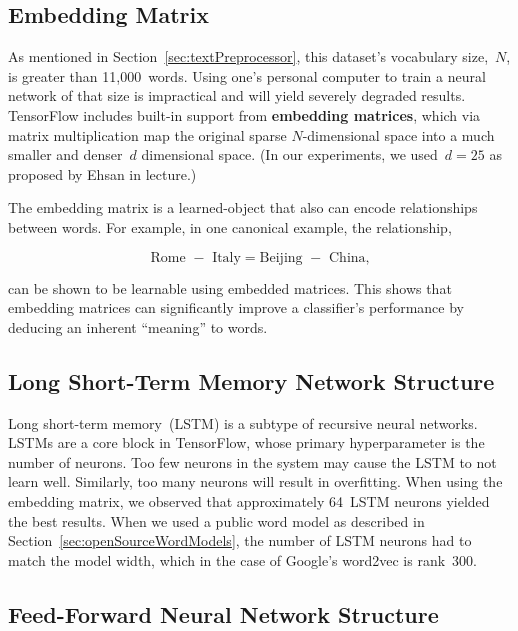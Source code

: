 \documentclass{report}
\begin{document}
  
  \subsection{Embedding Matrix}\label{sec:embeddingMatrix}
  
  As mentioned in Section~\ref{sec:textPreprocessor}, this dataset's vocabulary size,~$N$, is greater than 11,000~words.  Using one's personal computer to train a neural network of that size is impractical and will yield severely degraded results. TensorFlow includes built-in support from \textbf{embedding matrices}, which via matrix multiplication map the original sparse $N$-dimensional space into a much smaller and denser~$d$ dimensional space. (In our experiments, we used~$d=25$ as proposed by Ehsan in lecture.)  
  
  The embedding matrix is a learned-object that also can encode relationships between words.  For example, in one canonical example, the relationship, 
  
  \[\text{Rome } - \text{ Italy} = \text{Beijing } - \text{ China}\textrm{,}\]
  
  \noindent
  can be shown to be learnable using embedded matrices.  This shows that embedding matrices can significantly improve a classifier's performance by deducing an inherent ``meaning'' to words.
  
  \subsection{Long Short-Term Memory Network Structure}\label{sec:lstemOverview}
  
  Long short-term memory~(LSTM) is a subtype of recursive neural networks.  LSTMs are a core block in TensorFlow, whose primary hyperparameter is the number of neurons.  Too few neurons in the system may cause the LSTM to not learn well.  Similarly, too many neurons will result in overfitting.  When using the embedding matrix, we observed that approximately 64~LSTM neurons yielded the best results.  When we used a public word model as described in Section~\ref{sec:openSourceWordModels}, the number of LSTM neurons had to match the model width, which in the case of Google's word2vec is rank~300.
  
    
  \subsection{Feed-Forward Neural Network Structure}\label{sec:neuralNetOverview}
  
\end{document}
